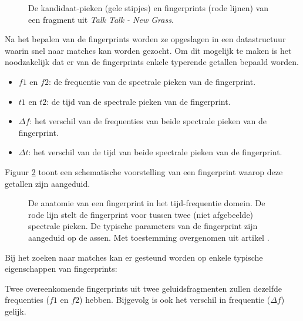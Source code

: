 \begin{figure}[h!]
	\captionsetup{width=0.7\textwidth}
	\caption[Kandidaat-pieken en fingerprints]{De kandidaat-pieken (gele stipjes) en fingerprints (rode lijnen)  van een fragment uit \textit{Talk Talk - New Grass}.}
	\begin{center}
		\advance\parskip0.3cm
		
	\end{center}
	\label{kandidaat-pieken}
\end{figure}

Na het bepalen van de fingerprints worden ze opgeslagen in een datastructuur waarin snel naar matches kan worden gezocht.
Om dit mogelijk te maken is het noodzakelijk dat er van de fingerprints enkele typerende getallen bepaald worden.

\begin{itemize}[noitemsep]
	\item $ f1 $ en $ f2 $: de frequentie van de spectrale pieken van de fingerprint.
	\item $ t1 $ en $ t2 $: de tijd van de spectrale pieken van de fingerprint.
	\item $ \Delta f $: het verschil van de frequenties van beide spectrale pieken van de fingerprint.
	\item $ \Delta t $: het verschil van de tijd van beide spectrale pieken van de fingerprint.
\end{itemize}

 Figuur \ref{schematische-fingerprint} toont een schematische voorstelling van een fingerprint waarop deze getallen zijn aangeduid.

\begin{figure}[h]
	\captionsetup{width=0.7\textwidth}
	\caption[De anatomie van een fingerprint]{De anatomie van een fingerprint in het tijd-frequentie domein. De rode lijn stelt de fingerprint voor tussen twee (niet afgebeelde) spectrale pieken. De typische parameters van de fingerprint zijn aangeduid op de assen. Met toestemming overgenomen uit artikel \cite{six2015multimodal}.}
	\begin{center}
		\advance\parskip0.3cm
		
	\end{center}
	\label{schematische-fingerprint}
\end{figure}

Bij het zoeken naar matches kan er gesteund worden op enkele typische eigenschappen van fingerprints: 

Twee overeenkomende fingerprints uit twee geluidsfragmenten zullen dezelfde frequenties  ($f1$ en $f2$) hebben. Bijgevolg is ook het verschil in frequentie ($\Delta f$) gelijk. 

